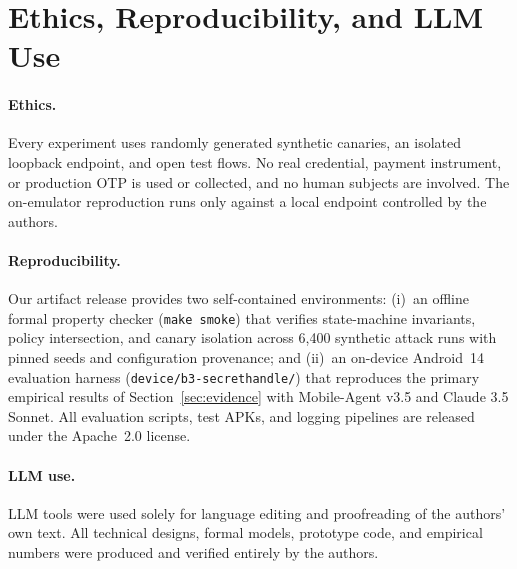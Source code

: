 \section{Ethics, Reproducibility, and LLM Use}
\label{sec:ethics}

\paragraph{Ethics.} Every experiment uses randomly generated synthetic canaries, an isolated loopback endpoint, and open test flows. No real credential, payment instrument, or production OTP is used or collected, and no human subjects are involved. The on-emulator reproduction runs only against a local endpoint controlled by the authors.

\paragraph{Reproducibility.} Our artifact release provides two self-contained environments: (i)~an offline formal property checker (\texttt{make smoke}) that verifies state-machine invariants, policy intersection, and canary isolation across 6,400 synthetic attack runs with pinned seeds and configuration provenance; and (ii)~an on-device Android~14 evaluation harness (\texttt{device/b3-secrethandle/}) that reproduces the primary empirical results of Section~\ref{sec:evidence} with Mobile-Agent v3.5 and Claude 3.5 Sonnet. All evaluation scripts, test APKs, and logging pipelines are released under the Apache~2.0 license.

\paragraph{LLM use.} LLM tools were used solely for language editing and proofreading of the authors' own text. All technical designs, formal models, prototype code, and empirical numbers were produced and verified entirely by the authors.
